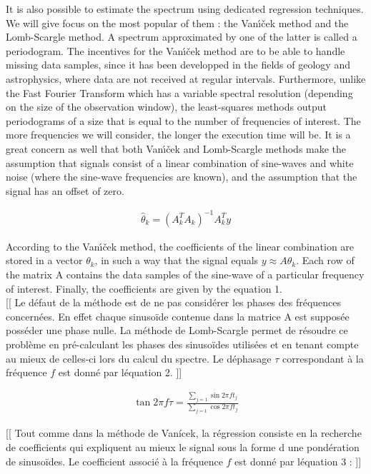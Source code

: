 \documentclass[letterpaper]{article}
\begin{document}
It is also possible to estimate the spectrum using dedicated regression techniques. We will give focus on the most popular of them :
the Van\'{\i}\v{c}ek method and the Lomb-Scargle method. A spectrum approximated by one of the latter is called a periodogram.
The incentives for the Van\'{\i}\v{c}ek method are to be able to handle missing data samples, since it has been developped in the fields of
geology and astrophysics, where data are not received at regular intervals. Furthermore, unlike the Fast Fourier Transform which has a
variable spectral resolution (depending on the size of the observation window), the least-squares methods output periodograms of a size
that is equal to the number of frequencies of interest. The more frequencies we will consider, the longer the execution time will be.
It is a great concern as well that both Van\'{\i}\v{c}ek and Lomb-Scargle methods make the assumption that signals consist of a
linear combination of sine-waves and white noise (where the sine-wave frequencies are known), and the assumption that the signal has an 
offset of zero.

\begin{align}
\hat{\theta}_{k} = (A_{k}^{T} A_{k})^{-1} A_{k}^{T} y
\end{align}

According to the Van\'{\i}\v{c}ek method, the coefficients of the linear combination are stored in a vector $\theta_{k}$, in such a way that
the signal equals $y \approx A\theta_{k}$. Each row of the matrix A contains the data samples of the sine-wave of a particular frequency of interest.
Finally, the coefficients are given by the equation 1. \citep{PS}\\

[[ Le défaut de la méthode est de ne pas considérer les phases des fréquences concernées. En effet chaque sinusoïde contenue dans la matrice A
est supposée posséder une phase nulle. La méthode de Lomb-Scargle permet de résoudre ce problème en pré-calculant les phases des sinusoïdes
utilisées et en tenant compte au mieux de celles-ci lors du calcul du spectre. Le déphasage $\tau$ correspondant à la fréquence $f$ est donné par
l\textquotesingle équation 2. \citep{LS} ]]

\begin{align}
\tan 2\pi f \tau = \frac{\sum\limits_{j=1} \sin 2\pi f t_{j}}{\sum\limits_{j=1} \cos 2\pi f t_{j}}
\end{align}

[[ Tout comme dans la méthode de Vanícek, la régression consiste en la recherche de coefficients qui expliquent au mieux le signal sous la forme d\textquotesingle
une pondération de sinusoïdes. Le coefficient associé à la fréquence $f$ est donné par l\textquotesingle équation 3 : ]]
\end{document}
